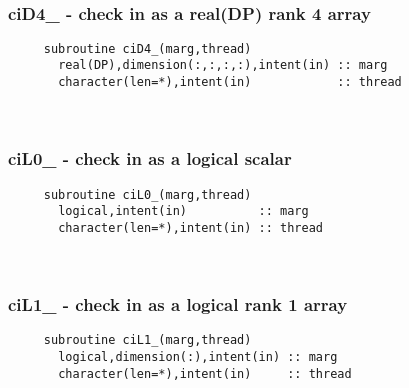  
\mbox{}\hrulefill\ 

  \subsubsection{ciD4\_ - check in as a real(DP) rank 4 array}

\begin{verbatim} 
     subroutine ciD4_(marg,thread)
       real(DP),dimension(:,:,:,:),intent(in) :: marg
       character(len=*),intent(in)            :: thread
 \end{verbatim}%
 
 
\mbox{}\hrulefill\ 
 
  \subsubsection{ciL0\_ - check in as a logical scalar}

\begin{verbatim} 
     subroutine ciL0_(marg,thread)
       logical,intent(in)          :: marg
       character(len=*),intent(in) :: thread
 \end{verbatim}%
 
 
\mbox{}\hrulefill\ 
 
  \subsubsection{ciL1\_ - check in as a logical rank 1 array}

\begin{verbatim} 
     subroutine ciL1_(marg,thread)
       logical,dimension(:),intent(in) :: marg
       character(len=*),intent(in)     :: thread
 \end{verbatim}%
 
